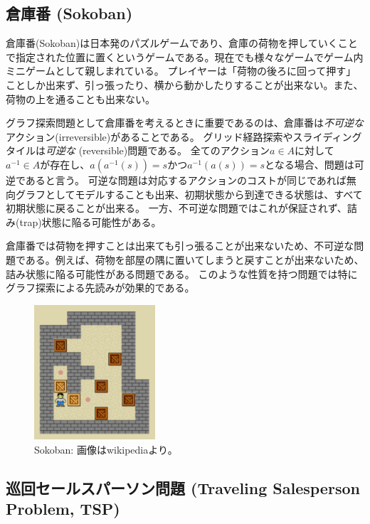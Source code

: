 \documentclass{report}
\begin{document}
\subsection{倉庫番 (Sokoban)}
倉庫番(Sokoban)は日本発のパズルゲームであり、倉庫の荷物を押していくことで指定された位置に置くというゲームである。現在でも様々なゲームでゲーム内ミニゲームとして親しまれている。
プレイヤーは「荷物の後ろに回って押す」ことしか出来ず、引っ張ったり、横から動かしたりすることが出来ない。また、荷物の上を通ることも出来ない。

グラフ探索問題として倉庫番を考えるときに重要であるのは、倉庫番は{\it 不可逆な}アクション(irreversible)があることである。
グリッド経路探索やスライディングタイルは{\it 可逆な} (reversible)問題である。
全てのアクション$a \in A$に対して$a^{-1} \in A$が存在し、$a(a^{-1}(s)) = s$かつ$a^{-1}(a(s)) = s$となる場合、問題は可逆であると言う。
可逆な問題は対応するアクションのコストが同じであれば無向グラフとしてモデルすることも出来、初期状態から到達できる状態は、すべて初期状態に戻ることが出来る。
一方、不可逆な問題ではこれが保証されず、詰み(trap)状態に陥る可能性がある。

倉庫番では荷物を押すことは出来ても引っ張ることが出来ないため、不可逆な問題である。例えば、荷物を部屋の隅に置いてしまうと戻すことが出来ないため、詰み状態に陥る可能性がある問題である。
このような性質を持つ問題では特にグラフ探索による先読みが効果的である。

\begin{figure}
\centering
\includegraphics[width=0.4\textwidth]{figures/sokoban.pdf}
\caption{Sokoban: 画像はwikipediaより。}
\label{fig:sokoban}
\end{figure}



\subsection{巡回セールスパーソン問題 (Traveling Salesperson Problem, TSP)}
\end{document}
